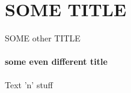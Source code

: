 \section{SOME TITLE}
\begin{frame}{SOME other TITLE}
	\framesubtitle{some even different title}
	Text 'n' stuff
\end{frame}
